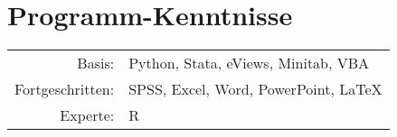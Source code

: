 \documentclass[a4paper,10pt]{article} %
\begin{document}



\section{Programm-Kenntnisse}
\begin{tabular}{rl}
Basis: & Python, Stata, eViews, Minitab, VBA\\

Fortgeschritten: & SPSS, Excel, Word, PowerPoint, LaTeX\\

Experte: & R
\end{tabular}



\end{document}

